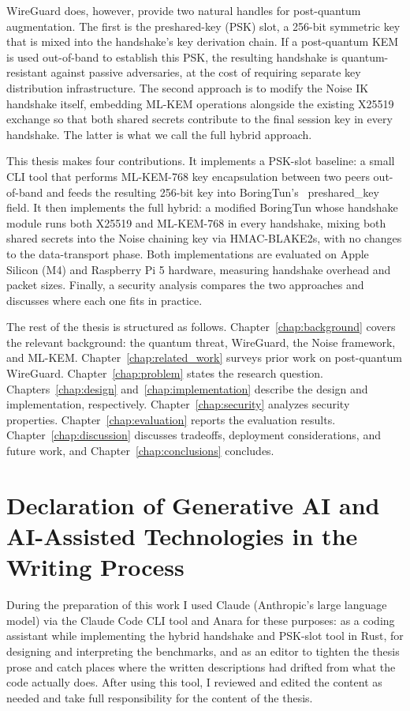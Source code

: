 WireGuard does, however, provide two natural handles for post-quantum augmentation. The first is the preshared-key (PSK) slot, a 256-bit symmetric key that is mixed into the handshake's key derivation chain. If a post-quantum KEM is used out-of-band to establish this PSK, the resulting handshake is quantum-resistant against passive adversaries, at the cost of requiring separate key distribution infrastructure. The second approach is to modify the Noise IK handshake itself, embedding ML-KEM operations alongside the existing X25519 exchange so that both shared secrets contribute to the final session key in every handshake. The latter is what we call the full hybrid approach.

This thesis makes four contributions. It implements a PSK-slot baseline: a small CLI tool that performs ML-KEM-768 key encapsulation between two peers out-of-band and feeds the resulting 256-bit key into BoringTun's~\cite{boringtun} preshared\_key field. It then implements the full hybrid: a modified BoringTun whose handshake module runs both X25519 and ML-KEM-768 in every handshake, mixing both shared secrets into the Noise chaining key via HMAC-BLAKE2s, with no changes to the data-transport phase. Both implementations are evaluated on Apple Silicon (M4) and Raspberry Pi 5 hardware, measuring handshake overhead and packet sizes. Finally, a security analysis compares the two approaches and discusses where each one fits in practice.

The rest of the thesis is structured as follows. Chapter~\ref{chap:background} covers the relevant background: the quantum threat, WireGuard, the Noise framework, and ML-KEM. Chapter~\ref{chap:related_work} surveys prior work on post-quantum WireGuard. Chapter~\ref{chap:problem} states the research question. Chapters~\ref{chap:design} and~\ref{chap:implementation} describe the design and implementation, respectively. Chapter~\ref{chap:security} analyzes security properties. Chapter~\ref{chap:evaluation} reports the evaluation results. Chapter~\ref{chap:discussion} discusses tradeoffs, deployment considerations, and future work, and Chapter~\ref{chap:conclusions} concludes.

\section*{Declaration of Generative AI and AI-Assisted Technologies in the Writing Process}

During the preparation of this work I used Claude (Anthropic's large language model) via the Claude Code CLI tool and Anara for these purposes: as a coding assistant while implementing the hybrid handshake and PSK-slot tool in Rust, for designing and interpreting the benchmarks, and as an editor to tighten the thesis prose and catch places where the written descriptions had drifted from what the code actually does. After using this tool, I reviewed and edited the content as needed and take full responsibility for the content of the thesis.
